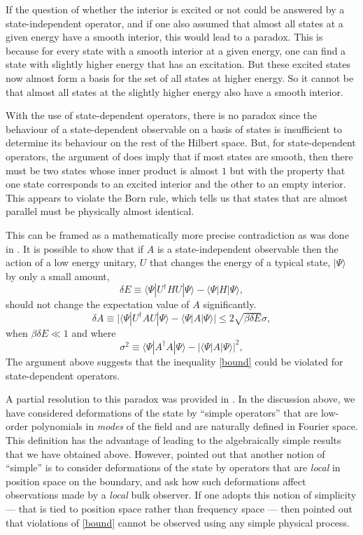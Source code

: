 \documentclass[12pt]{article}
\newcommand{\cop}[1]{#1}
\newcommand{\al}{\cop{A}} %
\newcommand{\be}{\begin{equation}}
\newcommand{\ee}{\end{equation}}
\begin{document}
If the question of whether the interior is excited or not could be answered by a state-independent operator, and if one also assumed that almost all states at a given energy have a smooth interior, this would lead to a paradox.
This is because for every state with a smooth interior at a given energy, one can find a state with slightly higher energy that has an excitation. But these excited states now almost form a basis for the set of all states at higher energy. So it cannot be that almost all states at the slightly higher energy also have a smooth interior.

With the use of state-dependent operators, there is no paradox since the behaviour of a state-dependent observable on a basis of states is insufficient to determine its behaviour on the rest of the Hilbert space. But, for state-dependent operators, the argument of \cite{Marolf:2015dia} does imply that if most states are smooth,  then there must be two states whose inner product is almost $1$ but with the property that one state corresponds to an excited interior and the other to an empty interior. This appears to violate the Born rule, which tells us that states that are almost parallel must be physically almost identical.

This can be framed as a mathematically more precise contradiction as was done in \cite{Raju:2016vsu}. It is possible to show that if $\al$ is a state-independent observable then the action of a low energy unitary, $U$ that changes the energy of a typical state, $|\Psi \rangle$ by only a small amount,
\be
\delta E \equiv \langle \Psi | U^{\dagger} H U |\Psi \rangle - \langle \Psi | H | \Psi \rangle,
\ee
should not change the expectation value of $\al$ significantly.
\be
\label{bound}
\delta  \al  \equiv \big|\langle \Psi | U^{\dagger} \al U |\Psi \rangle - \langle \Psi | \al |\Psi \rangle \big| \leq 2 \sqrt{\beta \delta E} \sigma,
\ee
when $\beta \delta E \ll 1$ and where
\be
\label{sigmadef}
\sigma^2 \equiv \langle \Psi| \al^{\dagger} \al | \Psi \rangle   - \left| \langle \Psi | \al | \Psi \rangle \right|^2,
\ee
The argument above suggests that the inequality \eqref{bound} could be violated for state-dependent operators.


A partial resolution to this paradox was provided in \cite{Raju:2016vsu}. In the discussion above, we have considered  deformations of the state by  ``simple operators'' that are low-order polynomials in {\em modes} of the field and are naturally defined in Fourier space. This definition has the advantage of leading to the algebraically simple results that we have obtained above.  However, \cite{Raju:2016vsu} pointed out that another notion of  ``simple'' is to consider deformations of the state by operators that are {\em local} in position space on the boundary, and ask how such deformations affect observations made by a {\em local} bulk observer. If one adopts this notion of simplicity --- that is tied to position space rather than frequency space ---  then \cite{Raju:2016vsu} pointed out that violations of \eqref{bound} cannot be observed using any simple physical process.
\end{document}
